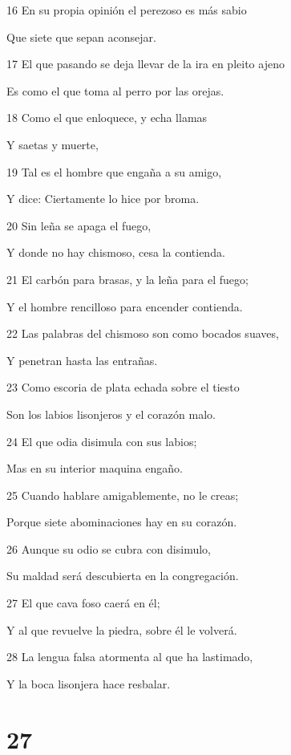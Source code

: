 \par 16 En su propia opinión el perezoso es más sabio
\par Que siete que sepan aconsejar.
\par 17 El que pasando se deja llevar de la ira en pleito ajeno
\par Es como el que toma al perro por las orejas.
\par 18 Como el que enloquece, y echa llamas
\par Y saetas y muerte,
\par 19 Tal es el hombre que engaña a su amigo,
\par Y dice: Ciertamente lo hice por broma.
\par 20 Sin leña se apaga el fuego,
\par Y donde no hay chismoso, cesa la contienda.
\par 21 El carbón para brasas, y la leña para el fuego;
\par Y el hombre rencilloso para encender contienda.
\par 22 Las palabras del chismoso son como bocados suaves,
\par Y penetran hasta las entrañas.
\par 23 Como escoria de plata echada sobre el tiesto
\par Son los labios lisonjeros y el corazón malo.
\par 24 El que odia disimula con sus labios;
\par Mas en su interior maquina engaño.
\par 25 Cuando hablare amigablemente, no le creas;
\par Porque siete abominaciones hay en su corazón.
\par 26 Aunque su odio se cubra con disimulo,
\par Su maldad será descubierta en la congregación.
\par 27 El que cava foso caerá en él;
\par Y al que revuelve la piedra, sobre él le volverá.
\par 28 La lengua falsa atormenta al que ha lastimado,
\par Y la boca lisonjera hace resbalar.

\chapter{27}

